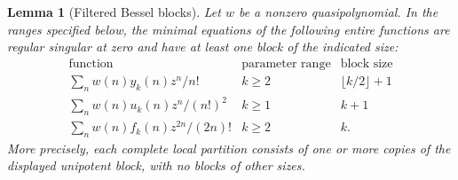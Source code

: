 \documentclass[11pt,a4paper]{article}
\newtheorem{lemma}[theorem]{Lemma}
\theoremstyle{definition}
\theoremstyle{remark}
\numberwithin{equation}{section}
\begin{document}
\begin{lemma}[Filtered Bessel blocks]
\label{E:qpa:blocks}
Let $w$ be a nonzero quasipolynomial.  In the ranges specified below,
the minimal equations of the following entire functions are regular
singular at zero and have at least one block of the indicated size:
\[
\begin{array}{c|c|c}
 \text{function}&\text{parameter range}&\text{block size}\\ \hline
 \displaystyle\sum_nw(n)y_k(n)z^n/n!
      &k\ge2&\lfloor k/2\rfloor+1\\[2pt]
 \displaystyle\sum_nw(n)u_k(n)z^n/(n!)^2
      &k\ge1&k+1\\[2pt]
 \displaystyle\sum_nw(n)f_k(n)z^{2n}/(2n)!
      &k\ge2&k.
\end{array}
\]
More precisely, each complete local partition consists of one or more
copies of the displayed unipotent block, with no blocks of other sizes.
\end{lemma}
\end{document}
